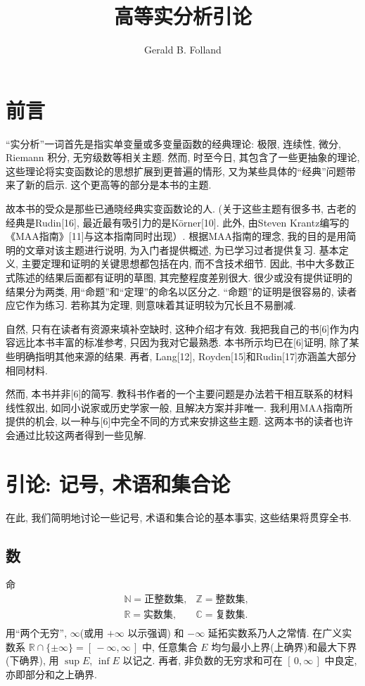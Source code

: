 \documentclass[twoside, fontset=fandol, punct=kaiming]{ctexbook}
\theoremstyle{innocent}
\begin{document}
\title{高等实分析引论}
\author{Gerald B. Folland}
\maketitle
\chapter*{前言}
``实分析''一词首先是指实单变量或多变量函数的经典理论: 极限, 连续性, 微分, Riemann 积分, 无穷级数等相关主题. 然而, 时至今日, 其包含了一些更抽象的理论, 这些理论将实变函数论的思想扩展到更普遍的情形, 又为某些具体的``经典''问题带来了新的启示. 这个更高等的部分是本书的主题.

故本书的受众是那些已通晓经典实变函数论的人. (关于这些主题有很多书, 古老的经典是Rudin[16], 最近最有吸引力的是K\"orner[10]. 此外, 由Steven Krantz编写的《MAA指南》[11]与这本指南同时出现）. 根据MAA指南的理念, 我的目的是用简明的文章对该主题进行说明, 为入门者提供概述, 为已学习过者提供复习. 基本定义, 主要定理和证明的关键思想都包括在内, 而不含技术细节. 因此, 书中大多数正式陈述的结果后面都有证明的草图, 其完整程度差别很大. 很少或没有提供证明的结果分为两类, 用``命题''和``定理''的命名以区分之. ``命题''的证明是很容易的, 读者应它作为练习. 若称其为定理, 则意味着其证明较为冗长且不易删减.

自然, 只有在读者有资源来填补空缺时, 这种介绍才有效. 我把我自己的书[6]作为内容远比本书丰富的标准参考, 只因为我对它最熟悉. 本书所示均已在[6]证明, 除了某些明确指明其他来源的结果. 再者, Lang[12], Royden[15]和Rudin[17]亦涵盖大部分相同材料.

然而, 本书并非[6]的简写. 教科书作者的一个主要问题是办法若干相互联系的材料线性叙出, 如同小说家或历史学家一般, 且解决方案并非唯一. 我利用MAA指南所提供的机会, 以一种与[6]中完全不同的方式来安排这些主题. 这两本书的读者也许会通过比较这两者得到一些见解.


\chapter{引论: 记号, 术语和集合论}
在此, 我们简明地讨论一些记号, 术语和集合论的基本事实, 这些结果将贯穿全书.
\section{数}
命
\[
    \begin{aligned}
         & \mathbb N  =\textit{正整数集},
         & \mathbb Z  =\textit{整数集},   \\
         & \mathbb R  =\textit{实数集},
         & \mathbb C  =\textit{复数集}.   \\
    \end{aligned}
\]
用``两个无穷'', $\infty$(或用 $+\infty$ 以示强调) 和 $-\infty$ 延拓实数系乃人之常情. 在广义实数系 $\mathbb R\cap\{\pm\infty\}=[\,-\infty,\infty\,]$ 中, 任意集合 $E$ 均匀最小上界(上确界)和最大下界(下确界), 用 $\sup E$, $\inf E$ 以记之. 再者, 非负数的无穷求和可在 $[\,0,\infty\,]$ 中良定, 亦即部分和之上确界.
\end{document}

